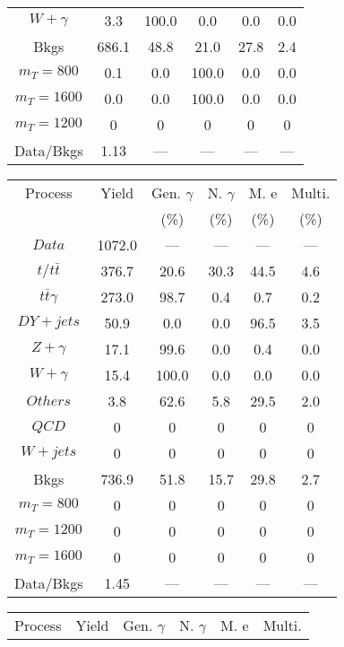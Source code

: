 \begin{figure}
\begin{minipage}[c]{0.32\textwidth}
{\begin{tabular}{cccccc}
$ W+\gamma $ &  3.3 &  100.0 &  0.0 &  0.0 &  0.0\\
Bkgs &  686.1 &  48.8 &  21.0 &  27.8 &  2.4\\
$ m_{T} = 800 $ &  0.1 &  0.0 &  100.0 &  0.0 &  0.0\\
$ m_{T} = 1600 $ &  0.0 &  0.0 &  100.0 &  0.0 &  0.0\\
$ m_{T} = 1200 $ &  0 &  0 &  0 &  0 &  0\\
Data/Bkgs &  1.13 &  --- &  --- &  --- &  ---\\
\hline
\end{tabular}
}
\end{minipage}
\begin{minipage}[c]{0.32\textwidth}
\centering
\tiny{
\begin{tabular}{cccccc}
\hline
Process & Yield & Gen. $\gamma$ & N. $\gamma$ & M. e & Multi. \\
 &  & (\%) & (\%) & (\%) & (\%)  \\
\hline
                                                                      $ Data $ &  1072.0 &  --- &  --- &  --- &  ---\\
$ t/t\bar{t} $ &  376.7 &  20.6 &  30.3 &  44.5 &  4.6\\
$ t\bar{t}\gamma $ &  273.0 &  98.7 &  0.4 &  0.7 &  0.2\\
$ DY+jets $ &  50.9 &  0.0 &  0.0 &  96.5 &  3.5\\
$ Z+\gamma $ &  17.1 &  99.6 &  0.0 &  0.4 &  0.0\\
$ W+\gamma $ &  15.4 &  100.0 &  0.0 &  0.0 &  0.0\\
$ Others $ &  3.8 &  62.6 &  5.8 &  29.5 &  2.0\\
$ QCD $ &  0 &  0 &  0 &  0 &  0\\
$ W+jets $ &  0 &  0 &  0 &  0 &  0\\
Bkgs &  736.9 &  51.8 &  15.7 &  29.8 &  2.7\\
$ m_{T} = 800 $ &  0 &  0 &  0 &  0 &  0\\
$ m_{T} = 1200 $ &  0 &  0 &  0 &  0 &  0\\
$ m_{T} = 1600 $ &  0 &  0 &  0 &  0 &  0\\
Data/Bkgs &  1.45 &  --- &  --- &  --- &  ---\\
\hline
\end{tabular}
}
\end{minipage}
\begin{minipage}[c]{0.32\textwidth}
\centering
\tiny{
\begin{tabular}{cccccc}
\hline
Process & Yield & Gen. $\gamma$ & N. $\gamma$ & M. e & Multi. \\

\end{tabular}}
\end{minipage}
\end{figure}
